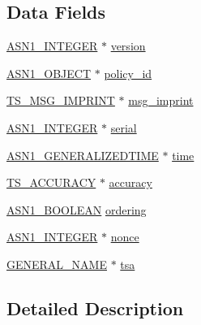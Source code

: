 \subsection*{Data Fields}
\begin{DoxyCompactItemize}
\item 
\hyperlink{crypto_2ossl__typ_8h_af4335399bf9774cb410a5e93de65998b}{A\+S\+N1\+\_\+\+I\+N\+T\+E\+G\+ER} $\ast$ \hyperlink{struct_t_s__tst__info__st_abf367aeef355b6acf5be7c569c4b28b0}{version}
\item 
\hyperlink{crypto_2ossl__typ_8h_ae3fda0801e4c8e250087052bafb3ce2e}{A\+S\+N1\+\_\+\+O\+B\+J\+E\+CT} $\ast$ \hyperlink{struct_t_s__tst__info__st_a2c948c122f4d643085abf0c35d6dffbe}{policy\+\_\+id}
\item 
\hyperlink{crypto_2ts_2ts_8h_a22e456a55112f85239a13f8f741d87f3}{T\+S\+\_\+\+M\+S\+G\+\_\+\+I\+M\+P\+R\+I\+NT} $\ast$ \hyperlink{struct_t_s__tst__info__st_a7bfa182e4675994a529a6dafbc8bc787}{msg\+\_\+imprint}
\item 
\hyperlink{crypto_2ossl__typ_8h_af4335399bf9774cb410a5e93de65998b}{A\+S\+N1\+\_\+\+I\+N\+T\+E\+G\+ER} $\ast$ \hyperlink{struct_t_s__tst__info__st_ae89753d950d21e4c15c296fced78c1b6}{serial}
\item 
\hyperlink{crypto_2ossl__typ_8h_abd19ea5b527807ce3a516e6a41440f84}{A\+S\+N1\+\_\+\+G\+E\+N\+E\+R\+A\+L\+I\+Z\+E\+D\+T\+I\+ME} $\ast$ \hyperlink{struct_t_s__tst__info__st_a6d45cb39d977108e6ecf082a848554f0}{time}
\item 
\hyperlink{crypto_2ts_2ts_8h_a85472dd127e577a5d020a1ad337c8b94}{T\+S\+\_\+\+A\+C\+C\+U\+R\+A\+CY} $\ast$ \hyperlink{struct_t_s__tst__info__st_a166ef18d36f2a1d978a3c00199c0f401}{accuracy}
\item 
\hyperlink{crypto_2ossl__typ_8h_abab3d5c6a3b9e049d27737dc227c0849}{A\+S\+N1\+\_\+\+B\+O\+O\+L\+E\+AN} \hyperlink{struct_t_s__tst__info__st_a918065b636f2e12efa72597b094817f8}{ordering}
\item 
\hyperlink{crypto_2ossl__typ_8h_af4335399bf9774cb410a5e93de65998b}{A\+S\+N1\+\_\+\+I\+N\+T\+E\+G\+ER} $\ast$ \hyperlink{struct_t_s__tst__info__st_a8b13ecb2aac904e4547773630a3b51e6}{nonce}
\item 
\hyperlink{crypto_2x509v3_2x509v3_8h_a6688fb8a0c7b8e63f3d47bac3a09eb15}{G\+E\+N\+E\+R\+A\+L\+\_\+\+N\+A\+ME} $\ast$ \hyperlink{struct_t_s__tst__info__st_ae78ca5f851cd20267443f211aec6cd16}{tsa}
\end{DoxyCompactItemize}


\subsection{Detailed Description}


